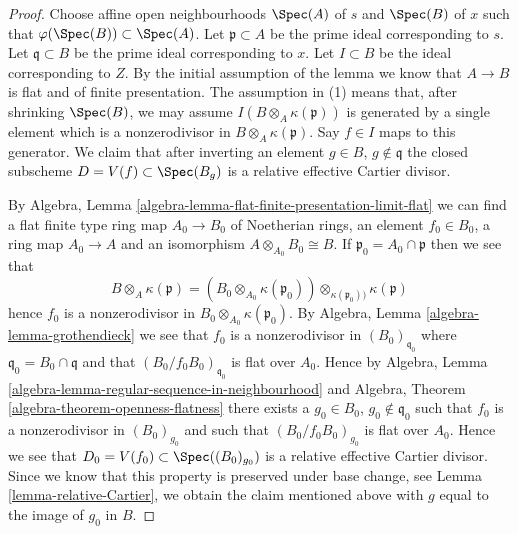 \begin{proof}
Choose affine open neighbourhoods $\Spec(A)$ of $s$ and
$\Spec(B)$ of $x$ such that
$\varphi(\Spec(B)) \subset \Spec(A)$.
Let $\mathfrak p \subset A$ be the prime ideal corresponding to $s$.
Let $\mathfrak q \subset B$ be the prime ideal corresponding to $x$.
Let $I \subset B$ be the ideal corresponding to $Z$.
By the initial assumption of the lemma we know that
$A \to B$ is flat and of finite presentation.
The assumption in (1) means that, after shrinking $\Spec(B)$, we may
assume $I(B \otimes_A \kappa(\mathfrak p))$ is generated by a single
element which is a nonzerodivisor in $B \otimes_A \kappa(\mathfrak p)$.
Say $f \in I$ maps to this generator. We claim that after inverting
an element $g \in B$, $g \not \in \mathfrak q$ the closed subscheme
$D = V(f) \subset \Spec(B_g)$ is a relative effective Cartier
divisor.

\medskip\noindent
By
Algebra, Lemma \ref{algebra-lemma-flat-finite-presentation-limit-flat}
we can find a flat finite type ring map $A_0 \to B_0$ of Noetherian
rings, an element $f_0 \in B_0$, a ring map $A_0 \to A$ and an isomorphism
$A \otimes_{A_0} B_0 \cong B$. If $\mathfrak p_0 = A_0 \cap \mathfrak p$
then we see that
$$
B \otimes_A \kappa(\mathfrak p) =
\left(B_0 \otimes_{A_0} \kappa(\mathfrak p_0)\right)
\otimes_{\kappa(\mathfrak p_0))} \kappa(\mathfrak p)
$$
hence $f_0$ is a nonzerodivisor in $B_0 \otimes_{A_0} \kappa(\mathfrak p_0)$.
By
Algebra, Lemma \ref{algebra-lemma-grothendieck}
we see that $f_0$ is a nonzerodivisor in $(B_0)_{\mathfrak q_0}$
where $\mathfrak q_0 = B_0 \cap \mathfrak q$ and
that $(B_0/f_0B_0)_{\mathfrak q_0}$ is flat over $A_0$. Hence by
Algebra, Lemma \ref{algebra-lemma-regular-sequence-in-neighbourhood}
and
Algebra, Theorem \ref{algebra-theorem-openness-flatness}
there exists a $g_0 \in B_0$, $g_0 \not \in \mathfrak q_0$ such
that $f_0$ is a nonzerodivisor in $(B_0)_{g_0}$ and such that
$(B_0/f_0B_0)_{g_0}$ is flat over $A_0$. Hence we see that
$D_0 = V(f_0) \subset \Spec((B_0)_{g_0})$ is a relative effective
Cartier divisor. Since we know that this property is preserved under
base change, see
Lemma \ref{lemma-relative-Cartier},
we obtain the claim mentioned above with $g$ equal to the image of $g_0$
in $B$.


\end{proof}
